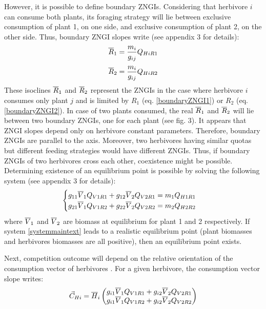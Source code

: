 \documentclass[12pt]{article}
\newcommand\barre[1]{\overline{\rule{0pt}{1.5ex}#1}}
\begin{document}
However, it is possible to define boundary ZNGIs. Considering that herbivore $i$ can consume both plants, its foraging strategy will lie between exclusive consumption of plant 1, on one side, and exclusive consumption of plant 2, on the other side. Thus, boundary ZNGI slopes write (see appendix 3 for details):
\begin{equation}\label{boundaryZNGI1}
\barre{R}_1=\frac{m_i}{g_{ij}}Q_{HiR1}
\end{equation}
\begin{equation}\label{boundaryZNGI2}
\barre{R}_2=\frac{m_i}{g_{ij}}Q_{HiR2}
\end{equation}
These isoclines $\barre{R}_1$ and $\barre{R}_2$ represent the ZNGIs in the case where herbivore $i$ consumes only plant $j$ and is limited by $R_1$ (eq. \ref{boundaryZNGI1}) or $R_2$ (eq. \ref{boundaryZNGI2}). In case of two plants consumed, the real $\barre{R}_1$ and $\barre{R}_2$ will lie between two boundary ZNGIs, one for each plant (see fig. 3).
It appears that ZNGI slopes depend only on herbivore constant parameters. Therefore, boundary ZNGIs are parallel to the axis. Moreover, two herbivores having similar quotas but different feeding strategies would have different ZNGIs. Thus, if boundary ZNGIs of two herbivores cross each other, coexistence might be possible. Determining existence of an equilibrium point is possible by solving the following system (see appendix 3 for details):
\begin{equation} \label{systemmaintext}
\begin{cases}
g_{11}\barre{V}_1 Q_{V1R1}+g_{12}\barre{V}_2 Q_{V2R1}=m_1 Q_{H1R1} \\
g_{21}\barre{V}_1 Q_{V1R2}+g_{22}\barre{V}_2 Q_{V2R2}=m_2 Q_{H2R2}
\end{cases} 
\end{equation}
where $\barre{V}_1$ and $\barre{V}_2$ are biomass at equilibrium for plant 1 and 2 respectively. If system \ref{systemmaintext} leads to a realistic equilibrium point (plant biomasses and herbivores biomasses are all positive), then an equilibrium point exists. 
\par
Next, competition outcome will depend on the relative orientation of the consumption vector of herbivores \citep{Tilman1980}. For a given herbivore, the consumption vector slope writes:
\begin{equation}
\vec{C}_{Hi}= \barre{H}_i
\begin{pmatrix}
g_{i1}\barre{V}_1Q_{V1R1}+g_{i2}\barre{V}_2Q_{V2R1} \\
g_{i1}\barre{V}_1Q_{V1R2}+g_{i2}\barre{V}_2Q_{V2R2} \\
\end{pmatrix} 
\end{equation}
\end{document}
